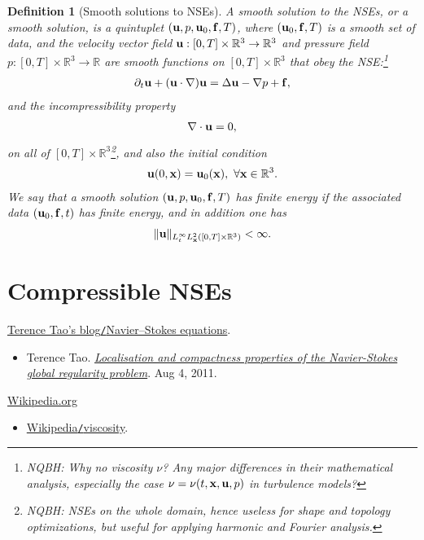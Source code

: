 \documentclass{article}
\numberwithin{equation}{section}
\newtheorem{definition}{Definition}[section]
\begin{document}
\begin{definition}[Smooth solutions to NSEs]
	A \emph{smooth solution to the NSEs}, or a \emph{smooth solution}, is a quintuplet $({\bf u},p,{\bf u}_0,{\bf f},T)$, where $({\bf u}_0,{\bf f},T)$ is a smooth set of data, and the velocity vector field ${\bf u}:[0,T]\times\mathbb{R}^3\to\mathbb{R}^3$ and pressure field $p:[0,T]\times\mathbb{R}^3\to\mathbb{R}$ are smooth functions on $[0,T]\times\mathbb{R}^3$ that obey the NSE:\footnote{NQBH: Why no viscosity $\nu$? Any major differences in their mathematical analysis, especially the case $\nu = \nu(t,{\bf x},{\bf u},p)$ in turbulence models?}
	\begin{align}
		\partial_t{\bf u} + ({\bf u}\cdot\nabla){\bf u} = \Delta{\bf u} - \nabla p + {\bf f},
	\end{align}
	and the incompressibility property
	\begin{align}
		\nabla\cdot{\bf u} = 0,
	\end{align}
	on all of $[0,T]\times\mathbb{R}^3$\footnote{NQBH: NSEs on the whole domain, hence useless for shape and topology optimizations, but useful for applying harmonic and Fourier analysis.}, and also the initial condition
	\begin{align}
		{\bf u}(0,{\bf x}) = {\bf u}_0({\bf x}),\ \forall{\bf x}\in\mathbb{R}^3.
	\end{align}
	We say that a smooth solution $({\bf u},p,{\bf u}_0,{\bf f},T)$ has \emph{finite energy} if the associated data $({\bf u}_0,{\bf f},t)$ has finite energy, and in addition one has
	\begin{align}
		\|{\bf u}\|_{L_t^\infty L_{\bf x}^2([0,T]\times\mathbb{R}^3)} < \infty.
	\end{align}
\end{definition}

\section{Compressible NSEs}




\begin{thebibliography}{99}
	 \href{https://terrytao.wordpress.com/tag/navier-stokes-equations/}{Terence Tao's blog\texttt{/}Navier--Stokes equations}.
	\begin{itemize}
		\item Terence Tao. \href{https://terrytao.wordpress.com/2011/08/04/localisation-and-compactness-properties-of-the-navier-stokes-global-regularity-problem}{\textit{Localisation and compactness properties of the Navier-Stokes global regularity problem}}. Aug 4, 2011.
	\end{itemize}
	
	 \href{https://en.wikipedia.org}{Wikipedia.org}
	\begin{itemize}
		\item \href{https://en.wikipedia.org/wiki/Viscosity}{Wikipedia\texttt{/}viscosity}.
	\end{itemize}
\end{thebibliography}
\printbibliography[heading=bibintoc]
	
\end{document}
